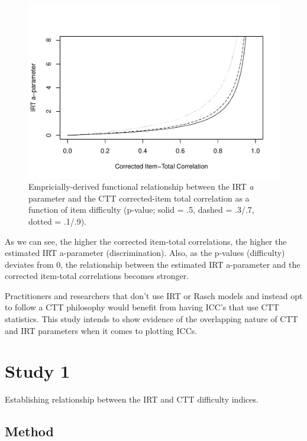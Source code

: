 \documentclass[
  man]{apa6}
\begin{document}
\begin{figure}
\centering
\includegraphics{ICC_project_files/figure-latex/acorrected-1.pdf}
\caption{\label{fig:acorrected}Empricially-derived functional relationship between the IRT \emph{a} parameter and the CTT corrected-item total correlation as a function of item difficulty (p-value; solid = .5, dashed = .3/.7, dotted = .1/.9).}
\end{figure}

As we can see, the higher the corrected item-total correlations, the higher the estimated IRT a-parameter (discrimination). Also, as the p-values (difficulty) deviates from 0, the relationship between the estimated IRT a-parameter and the corrected item-total correlations becomes stronger.

Practitioners and researchers that don't use IRT or Rasch models and instead opt to follow a CTT philosophy would benefit from having ICC's that use CTT statistics. This study intends to show evidence of the overlapping nature of CTT and IRT parameters when it comes to plotting ICCs.

\hypertarget{study-1}{%
\section{Study 1}\label{study-1}}

Establishing relationship between the IRT and CTT difficulty indices.

\hypertarget{method}{%
\subsection{Method}\label{method}}
\end{document}
